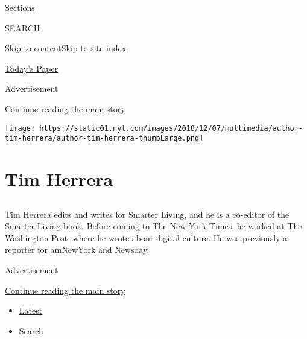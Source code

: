 Sections

SEARCH

\protect\hyperlink{site-content}{Skip to
content}\protect\hyperlink{site-index}{Skip to site index}

\href{https://myaccount.nytimes.com/auth/login?response_type=cookie\&client_id=vi}{}

\href{https://www.nytimes.com/section/todayspaper}{Today's Paper}

Advertisement

\protect\hyperlink{after-top}{Continue reading the main story}

\texttt{[image: https://static01.nyt.com/images/2018/12/07/multimedia/author-tim-herrera/author-tim-herrera-thumbLarge.png]}

\hypertarget{tim-herrera}{%
\section{Tim Herrera}\label{tim-herrera}}

\subsection{}

Tim Herrera edits and writes for Smarter Living, and he is a co-editor
of the Smarter Living book. Before coming to The New York Times, he
worked at The Washington Post, where he wrote about digital culture. He
was previously a reporter for amNewYork and Newsday.

Advertisement

\protect\hyperlink{after-mid1}{Continue reading the main story}

\begin{itemize}
\tightlist
\item
  \protect\hyperlink{stream-panel}{Latest}
\item
  Search
\end{itemize}

